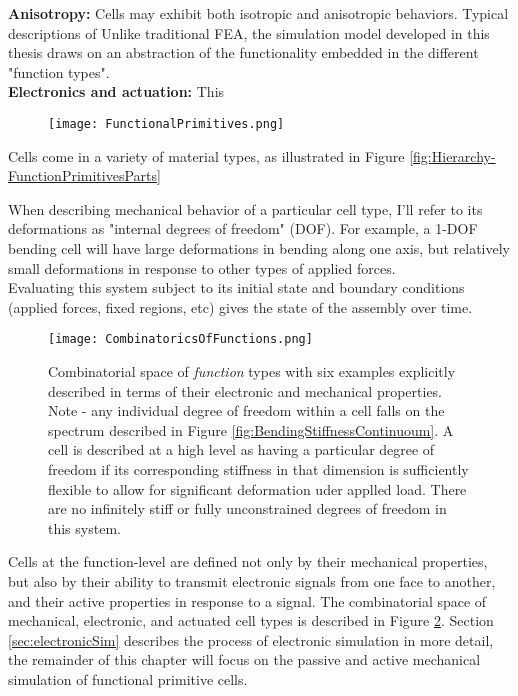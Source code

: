 {\textbf{Anisotropy:} Cells may exhibit both isotropic and anisotropic behaviors.  Typical descriptions of
Unlike traditional FEA, the simulation model developed in this thesis draws on an abstraction of the functionality embedded in the different "function types".\\

\textbf{Electronics and actuation:} This \\

\begin{figure}
  \texttt{[image: FunctionalPrimitives.png]}
  \caption{}
  \label{fig:FunctionalPrimitives}
\end{figure}

Cells come in a variety of material types, as illustrated in Figure \ref{fig:Hierarchy-FunctionPrimitivesParts}

When describing mechanical behavior of a particular cell type, I'll refer to its deformations as "internal degrees of freedom" (DOF).  For example, a 1-DOF bending cell will have large deformations in bending along one axis, but relatively small deformations in response to other types of applied forces.\\

Evaluating this system subject to its initial state and boundary conditions (applied forces, fixed regions, etc) gives the state of the assembly over time.\\

\begin{figure}
  \texttt{[image: CombinatoricsOfFunctions.png]}
  \caption{Combinatorial space of \textit{function} types with six examples explicitly described in terms of their electronic and mechanical properties.  Note - any individual degree of freedom within a cell falls on the spectrum described in Figure \ref{fig:BendingStiffnessContinuoum}.  A cell is described at a high level as having a particular degree of freedom if its corresponding stiffness in that dimension is sufficiently flexible to allow for significant deformation uder applled load.  There are no infinitely stiff or fully unconstrained degrees of freedom in this system.}
  \label{fig:CombinatoricsOfFunctions}
\end{figure}

Cells at the function-level are defined not only by their mechanical properties, but also by their ability to transmit electronic signals from one face to another, and their active properties in response to a signal. The combinatorial space of mechanical, electronic, and actuated cell types is described in Figure \ref{fig:CombinatoricsOfFunctions}.  Section \ref{sec:electronicSim} describes the process of electronic simulation in more detail, the remainder of this chapter will focus on the passive and active mechanical simulation of functional primitive cells.

}
